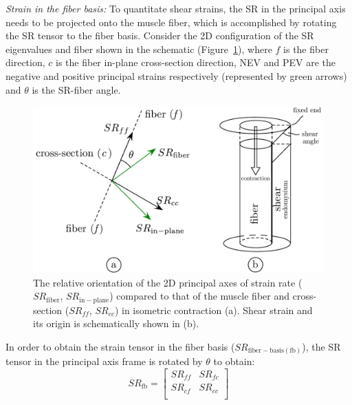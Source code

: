 \textit{Strain in the fiber basis:}
To quantitate shear strains, the SR in the principal axis needs to be projected onto the muscle fiber, which is accomplished by rotating the SR tensor to the fiber basis. 
Consider the 2D configuration of the SR eigenvalues and fiber shown in the schematic (Figure~\ref{fig: SR1_1}), where $f$ is the fiber direction, $c$ is the fiber in-plane cross-section direction, NEV and PEV are the negative and positive principal strains respectively (represented by green arrows) and $\theta$ is the SR-fiber angle. 
\begin{figure}[!htb]
\vspace{+0.2cm}
\centering
\includegraphics[scale=0.63]{Figures/SR2dSchematic.pdf}
\caption[Schematic of strain rate in principal axes and shear strain in muscle during isometric contraction.]{The relative orientation of the 2D principal axes of strain rate ($SR_\mathrm{fiber}$, $SR_\mathrm{in-plane}$) compared to that of the muscle fiber and cross-section ($SR_{ff}$, $SR_{cc}$) in isometric contraction (a). Shear strain and its origin is schematically shown in (b).}
\label{fig: SR1_1}
\end{figure}
In order to obtain the strain tensor in the fiber basis ($SR_{\mathrm{fiber-basis(fb)}}$), the SR tensor in the principal axis frame is rotated by $\theta$ to obtain:
\begin{equation}\label{eq: SR fiber basis}
SR_{\mathrm{fb}} = \left [
\begin{matrix}
SR_{ff} & SR_{fc}\\
SR_{cf} & SR_{cc}\\
\end{matrix} \right]
\end{equation}
